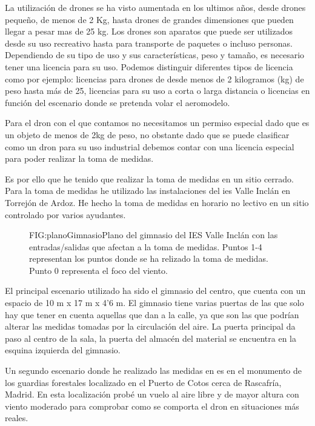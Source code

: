 
La utilización de drones se ha visto aumentada en los ultimos años, desde drones pequeño, de menos de 2 Kg, hasta drones de grandes dimensiones que pueden llegar a pesar mas de 25 kg. Los drones son aparatos que puede ser utilizados desde su uso recreativo hasta para transporte de paquetes o incluso personas. Dependiendo de su tipo de uso y sus características, peso y tamaño, es necesario tener una licencia para su uso. Podemos distinguir diferentes tipos de licencia como por ejemplo: licencias para drones de desde menos de 2 kilogramos (kg) de peso hasta más de 25, licencias para su uso a corta o larga distancia o licencias en función del escenario donde se pretenda volar el aeromodelo.

Para el dron con el que contamos no necesitamos un permiso especial dado que es un objeto de menos de 2kg de peso, no obstante dado que se puede clasificar como un dron para su uso industrial debemos contar con una licencia especial para poder realizar la toma de medidas.

Es por ello que he tenido que realizar la toma de medidas en un sitio cerrado. Para la toma de medidas he utilizado las instalaciones del \ac{ies} Valle Inclán en Torrejón de Ardoz. He hecho la toma de medidas en horario no lectivo en un sitio controlado por varios ayudantes.

\begin{figure}[Plano gimnasio IES Valle Inclán.]{FIG:planoGimnasio}{Plano del gimnasio del IES Valle Inclán con las entradas/salidas que afectan a la toma de medidas. Puntos 1-4 representan los puntos donde se ha relizado la toma de medidas. Punto 0 representa el foco del viento.}
\end{figure}

El principal escenario utilizado ha sido el gimnasio del centro, que cuenta con un espacio de 10 m x 17 m x 4'6 m. El gimnasio tiene varias puertas de las que solo hay que tener en cuenta aquellas que dan a la calle, ya que son las que podrían alterar las medidas tomadas por la circulación del aire. La puerta principal da paso al centro de la sala, la puerta del almacén del material se encuentra en la esquina izquierda del gimnasio. 

Un segundo escenario donde he realizado las medidas en es en el monumento de los guardias forestales localizado en el Puerto de Cotos cerca de Rascafría, Madrid. En esta localización probé un vuelo al aire libre y de mayor altura con viento moderado para comprobar como se comporta el dron en situaciones más reales.

